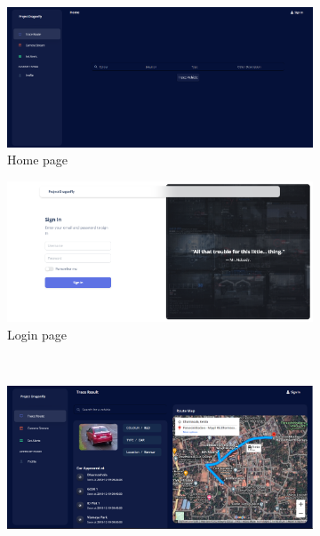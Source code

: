 \lipsum[1]

\begin{figure}[!ht]
	\centering
	\begin{subfigure}[b]{0.48\linewidth}
		\centering
		\includegraphics[width=\linewidth]{Images/UI/home}
		\caption{Home page}
		\label{fig:home}
	\end{subfigure} \hfill
	\begin{subfigure}[b]{0.48\linewidth}
		\centering
		\includegraphics[width=\linewidth]{Images/UI/login}
		\caption{Login page}
		\label{fig:login}
	\end{subfigure} \\ \vspace{3mm}
	\begin{subfigure}[b]{0.48\linewidth}
		\centering
		\includegraphics[width=\linewidth]{Images/UI/result}

\end{subfigure}
\end{figure}
